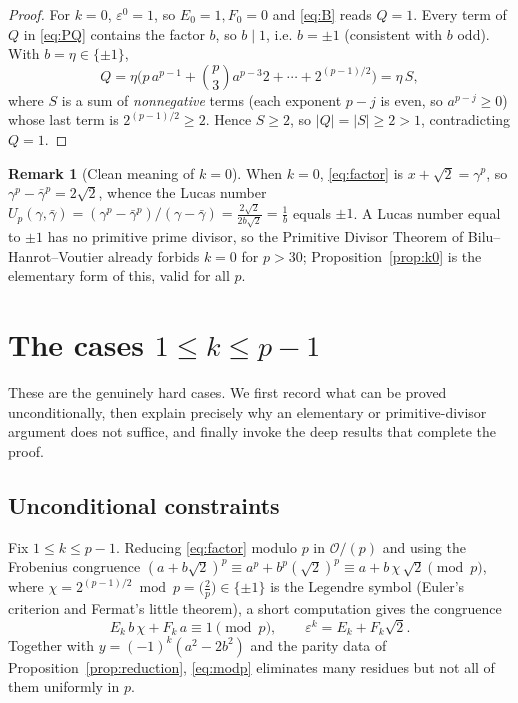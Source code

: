 \documentclass{amsart}
\theoremstyle{definition}
\newtheorem{remark}{Remark}
\begin{document}
\begin{proof}
For $k=0$, $\varepsilon^0=1$, so $E_0=1,F_0=0$ and \eqref{eq:B} reads $Q=1$.
Every term of $Q$ in \eqref{eq:PQ} contains the factor $b$, so $b\mid1$, i.e.
$b=\pm1$ (consistent with $b$ odd). With $b=\eta\in\{\pm1\}$,
\[
Q=\eta\Big(p\,a^{p-1}+\binom p3 a^{p-3}2+\cdots+2^{(p-1)/2}\Big)=\eta\,S,
\]
where $S$ is a sum of \emph{nonnegative} terms (each exponent $p-j$ is even,
so $a^{p-j}\ge0$) whose last term is $2^{(p-1)/2}\ge2$. Hence $S\ge2$, so
$|Q|=|S|\ge2>1$, contradicting $Q=1$.
\end{proof}

\begin{remark}[Clean meaning of $k=0$]
When $k=0$, \eqref{eq:factor} is $x+\sqrt2=\gamma^p$, so
$\gamma^p-\bar\gamma^p=2\sqrt2$, whence the Lucas number
$U_p(\gamma,\bar\gamma)=(\gamma^p-\bar\gamma^p)/(\gamma-\bar\gamma)=\frac{2\sqrt2}{2b\sqrt2}=\frac1b$
equals $\pm1$. A Lucas number equal to $\pm1$ has no primitive prime divisor,
so the Primitive Divisor Theorem of Bilu--Hanrot--Voutier already forbids
$k=0$ for $p>30$; Proposition~\ref{prop:k0} is the elementary form of this,
valid for all $p$.
\end{remark}

\section{The cases $1\le k\le p-1$}\label{sec:knonzero}

These are the genuinely hard cases. We first record what can be proved
unconditionally, then explain precisely why an elementary or
primitive-divisor argument does not suffice, and finally invoke the deep
results that complete the proof.

\subsection*{Unconditional constraints}
Fix $1\le k\le p-1$. Reducing \eqref{eq:factor} modulo $p$ in $\mathcal O/(p)$
and using the Frobenius congruence $(a+b\sqrt2)^p\equiv a^p+b^p(\sqrt2)^p
\equiv a+b\,\chi\,\sqrt2\pmod p$, where
$\chi=2^{(p-1)/2}\bmod p=\big(\tfrac2p\big)\in\{\pm1\}$ is the Legendre symbol
(Euler's criterion and Fermat's little theorem), a short computation gives the
congruence
\begin{equation}\label{eq:modp}
E_k\,b\,\chi+F_k\,a\equiv 1\pmod p,\qquad \varepsilon^k=E_k+F_k\sqrt2 .
\end{equation}
Together with $y=(-1)^k(a^2-2b^2)$ and the parity data of
Proposition~\ref{prop:reduction}, \eqref{eq:modp} eliminates many residues but
not all of them uniformly in $p$.
\end{document}
